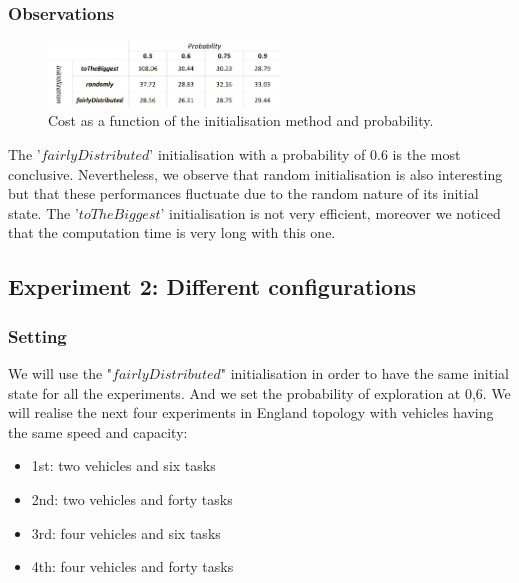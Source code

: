 \documentclass[11pt]{article}
\begin{document}
\subsubsection{Observations}
\begin{figure}[ht]
    \centering
    \includegraphics[width=0.55\textwidth, frame]{exp1.PNG}
    \caption{Cost as a function of the initialisation method and probability.}
    \label{fig:1}
\end{figure}

The '$fairlyDistributed$' initialisation with a probability of 0.6 is the most conclusive. Nevertheless, we observe that random initialisation is also interesting but that these performances fluctuate due to the random nature of its initial state. The '$toTheBiggest$' initialisation is not very efficient, moreover we noticed that the computation time is very long with this one.

\subsection{Experiment 2: Different configurations}

\subsubsection{Setting}
We will use the "$fairlyDistributed$" initialisation in order to have the same initial state for all the experiments. And we set the probability of exploration at 0,6.
We will realise the next four experiments in England topology with vehicles having the same speed and capacity:
\begin{itemize}
    \item 1st: two vehicles and six tasks
    \item 2nd: two vehicles and forty tasks
    \item 3rd: four vehicles and six tasks
    \item 4th: four vehicles and forty tasks
\end{itemize}
\end{document}
